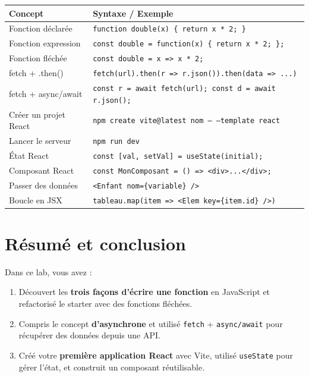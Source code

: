 \documentclass[11pt,a4paper]{article}
\begin{document}
\begin{center}
\begin{tabular}{lp{8cm}}
\toprule
\textbf{Concept} & \textbf{Syntaxe / Exemple} \\
\midrule
Fonction déclarée & \texttt{function double(x) \{ return x * 2; \}} \\
Fonction expression & \texttt{const double = function(x) \{ return x * 2; \};} \\
Fonction fléchée & \texttt{const double = x => x * 2;} \\
\midrule
fetch + .then() & \texttt{fetch(url).then(r => r.json()).then(data => ...)} \\
fetch + async/await & \texttt{const r = await fetch(url); const d = await r.json();} \\
\midrule
Créer un projet React & \texttt{npm create vite@latest nom -- --template react} \\
Lancer le serveur & \texttt{npm run dev} \\
État React & \texttt{const [val, setVal] = useState(initial);} \\
Composant React & \texttt{const MonComposant = () => <div>...</div>;} \\
Passer des données & \texttt{<Enfant nom=\{variable\} />} \\
Boucle en JSX & \texttt{tableau.map(item => <Elem key=\{item.id\} />)} \\
\bottomrule
\end{tabular}
\end{center}

\newpage

\section{Résumé et conclusion}

Dans ce lab, vous avez :

\begin{enumerate}[nosep]
    \item Découvert les \textbf{trois façons d'écrire une fonction} en JavaScript et refactorisé le starter avec des fonctions fléchées.
    \item Compris le concept \textbf{d'asynchrone} et utilisé \texttt{fetch} + \texttt{async/await} pour récupérer des données depuis une API.
    \item Créé votre \textbf{première application React} avec Vite, utilisé \texttt{useState} pour gérer l'état, et construit un composant réutilisable.
\end{enumerate}
\end{document}
